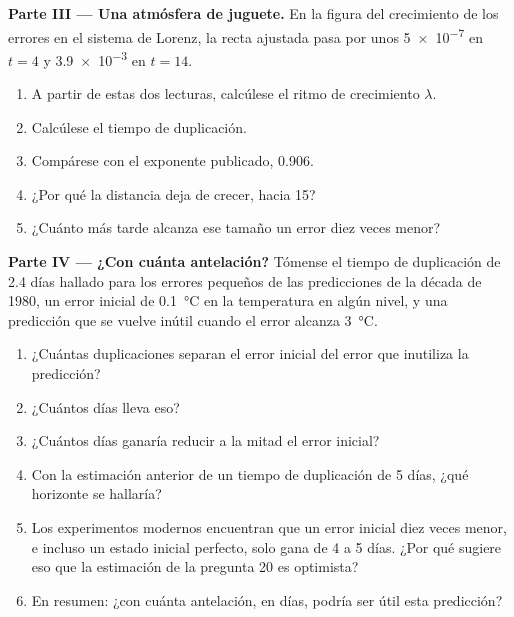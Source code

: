 \begin{problem}
\medskip\noindent\textbf{Parte III --- Una atmósfera de juguete.}
En la figura del crecimiento de los errores en el sistema de Lorenz, la recta ajustada pasa por
unos \num{5e-7} en $t = 4$ y \num{3.9e-3} en $t = 14$.
\begin{enumerate}[resume]
  \item A partir de estas dos lecturas, calcúlese el ritmo de crecimiento $\lambda$.
  \item Calcúlese el tiempo de duplicación.
  \item Compárese con el exponente publicado, 0.906.
  \item ¿Por qué la distancia deja de crecer, hacia 15?
  \item ¿Cuánto más tarde alcanza ese tamaño un error diez veces menor?
\end{enumerate}

\medskip\noindent\textbf{Parte IV --- ¿Con cuánta antelación?}
Tómense el tiempo de duplicación de 2.4 días hallado para los errores pequeños de las predicciones de la década de 1980, un
error inicial de \qty{0.1}{\celsius} en la temperatura en algún nivel, y una predicción que se vuelve
inútil cuando el error alcanza \qty{3}{\celsius}.
\begin{enumerate}[resume]
  \item ¿Cuántas duplicaciones separan el error inicial del error que inutiliza la predicción?
  \item ¿Cuántos días lleva eso?
  \item ¿Cuántos días ganaría reducir a la mitad el error inicial?
  \item Con la estimación anterior de un tiempo de duplicación de 5 días, ¿qué horizonte se hallaría?
  \item Los experimentos modernos encuentran que un error inicial diez veces menor, e incluso un estado
        inicial perfecto, solo gana de 4 a 5 días. ¿Por qué sugiere eso que la estimación de
        la pregunta 20 es optimista?
  \item En resumen: ¿con cuánta antelación, en días, podría ser útil esta predicción?
\end{enumerate}
\end{problem}
